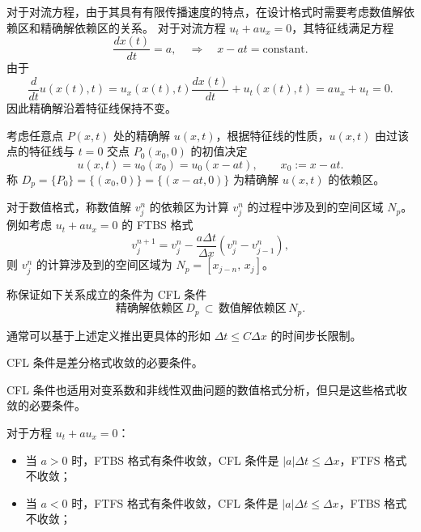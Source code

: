 对于对流方程，由于其具有有限传播速度的特点，在设计格式时需要考虑数值解依赖区和精确解依赖区的关系。
对于对流方程 $u_t + a u_x = 0$，其特征线满足方程
\[
    \frac{d x(t)}{dt} = a, \quad \Rightarrow \quad x - a t = \text{constant}.
\]
由于
\[
    \frac{d}{dt} u(x(t),t) = u_x(x(t),t) \frac{d x(t)}{dt} + u_t(x(t),t) = a u_x + u_t = 0.
\]
因此精确解沿着特征线保持不变。

考虑任意点 $P(x,t)$ 处的精确解 $u(x,t)$，根据特征线的性质，$u(x,t)$ 由过该点的特征线与 $t=0$ 交点 $P_0(x_0,0)$ 的初值决定
\[
    u(x,t) = u_0(x_0) = u_0(x - a t),\qquad x_0 := x - a t.
\]
称 $D_p = \{P_0\} = \{(x_0,0)\} = \{(x - a t,0)\}$ 为精确解 $u(x,t)$ 的依赖区。

对于数值格式，称数值解 $v_j^n$ 的依赖区为计算 $v_j^n$ 的过程中涉及到的空间区域 $N_p$。
例如考虑 $u_t + a u_x = 0$ 的 FTBS 格式
\[
    v_{j}^{n+1} = v_j^n - \frac{a \Delta t}{\Delta x} \left(v_{j}^n - v_{j-1}^n\right),
\]
则 $v_j^n$ 的计算涉及到的空间区域为 $N_p = [x_{j-n},\, x_j]$。

\begin{definition}
    称保证如下关系成立的条件为 CFL 条件
    \[
        \text{精确解依赖区}\,D_p \,\subset\, \text{数值解依赖区}\,N_p.
    \]
\end{definition}

\begin{remark}
    通常可以基于上述定义推出更具体的形如 $\Delta t \le C \Delta x$ 的时间步长限制。
\end{remark}

\begin{theorem}
    CFL 条件是差分格式收敛的必要条件。
\end{theorem}

\begin{remark}
    CFL 条件也适用对变系数和非线性双曲问题的数值格式分析，但只是这些格式收敛的必要条件。
\end{remark}

\begin{example}\label{eg:upwind}
    对于方程 $u_t + a u_x = 0$：
    \begin{itemize}
        \item 当 $a > 0$ 时，FTBS 格式有条件收敛，CFL 条件是 $|a| \Delta t \le \Delta x$，FTFS 格式不收敛；
        \item 当 $a < 0$ 时，FTFS 格式有条件收敛，CFL 条件是 $|a| \Delta t \le \Delta x$，FTBS 格式不收敛；
    \end{itemize}
\end{example}


